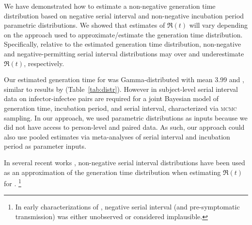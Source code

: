 We have demonstrated how to estimate
a non-negative generation time distribution
based on negative serial interval
and non-negative incubation period parametric distributions.
We showed that estimates of $\Re(t)$ will vary depending on
the approach used to approximate/estimate the generation time distribution.
Specifically, relative to the estimated generation time distribution,
non-negative and negative-permitting serial interval distributions
may over and underestimate $\Re(t)$, respectively.
\par
Our estimated generation time for \covid was
Gamma-distributed with mean 3.99 and ,
similar to results by \textcite{Ganyani2020} (Table~\ref{tab:distr}).
However in \cite{Ganyani2020}
subject-level serial interval data on infector-infectee pairs
are required for a joint Bayesian model of
generation time, incubation period, and serial interval,
characterized via \textsc{mcmc} sampling.
In our approach, we used parametric distributions as inputs
because we did not have access to 
person-level and paired data. %
As such, our approach could also use pooled estimates via meta-analyses of
serial interval and incubation period as parameter inputs.
\par
In several recent works \cite{You2020,Tang2020,Zhang2020a,Zhang2020},
non-negative serial interval distributions have been used
as an approximation of the generation time distribution
when estimating $\Re(t)$ for \covid.%
\footnote{In early characterizations of \covid
  \cite{Li2020,Zhang2020,Nishiura2020,Zhao2020,You2020},
  negative serial interval (and pre-symptomatic transmission)
  was either unobserved or considered implausible.}
